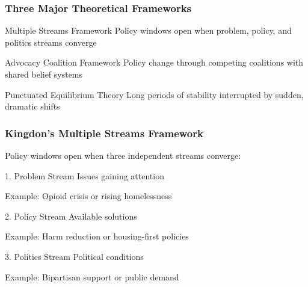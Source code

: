 \documentclass[10pt]{beamer}
\begin{document}
\begin{frame}
\frametitle{Three Major Theoretical Frameworks}

\begin{block}{\textcolor{streamblue}{Multiple Streams Framework}}
Policy windows open when problem, policy, and politics streams converge
\end{block}

\begin{block}{\textcolor{coalitionred}{Advocacy Coalition Framework}}
Policy change through competing coalitions with shared belief systems
\end{block}

\begin{block}{\textcolor{punctuationorange}{Punctuated Equilibrium Theory}}
Long periods of stability interrupted by sudden, dramatic shifts
\end{block}

\end{frame}

\begin{frame}
\frametitle{Kingdon's Multiple Streams Framework}

Policy windows open when three independent streams converge:

\vspace{0.5cm}

\begin{block}{\textcolor{streamblue}{1. Problem Stream}}
Issues gaining attention

Example: Opioid crisis or rising homelessness
\end{block}

\begin{block}{\textcolor{streamgreen}{2. Policy Stream}}
Available solutions

Example: Harm reduction or housing-first policies
\end{block}

\begin{block}{\textcolor{streampurple}{3. Politics Stream}}
Political conditions

Example: Bipartisan support or public demand
\end{block}

\end{frame}
\end{document}
